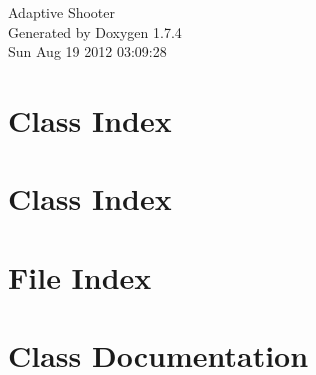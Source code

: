 \documentclass[a4paper]{book}
\begin{document}
\hypersetup{pageanchor=false}
\begin{titlepage}
\vspace*{7cm}
\begin{center}
{\Large Adaptive Shooter }\\
\vspace*{1cm}
{\large Generated by Doxygen 1.7.4}\\
\vspace*{0.5cm}
{\small Sun Aug 19 2012 03:09:28}\\
\end{center}
\end{titlepage}
\clearemptydoublepage
{}
\tableofcontents
\clearemptydoublepage
{}
\hypersetup{pageanchor=true}
\chapter{Class Index}

\chapter{Class Index}

\chapter{File Index}

\chapter{Class Documentation}



























\end{document}
